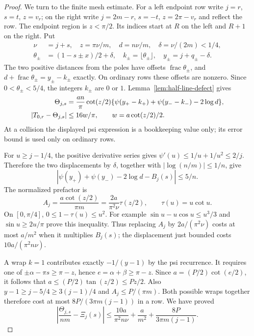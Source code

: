 \begin{proof}
We turn to the finite mesh estimate.  For a left endpoint row write
$j=r$, $s=t$, $z=v_r$; on the right write
$j=2m-r$, $s=-t$, $z=2\pi-v_r$ and reflect the row.
The endpoint region is $z<\pi/2$.  Its indices start at $R$ on
the left and $R+1$ on the right.  Put
\begin{align*}
 \nu&=j+s,\quad z=\pi\nu/m,\quad d=n\nu/m,
       \quad\delta=\nu/(2m)<1/4,\\
 \theta_\pm&=(1-s\pm x)/2+\delta,\quad
       k_\pm=\lfloor\theta_\pm\rfloor,\quad
       y_\pm=j+q_\pm-\delta.
\end{align*}
The two positive distances from the poles have offsets
$\operatorname{frac}\theta_\pm$, and
$d+\operatorname{frac}\theta_\pm=y_\pm-k_\pm$ exactly.
On ordinary rows these offsets are nonzero.  Since
$0<\theta_\pm<5/4$, the integers $k_\pm$ are $0$ or $1$.
Lemma~\ref{lem:half-line-defect} gives
\begin{align}
 \Theta_{j,s}&=\frac{an}{\pi}\cot(z/2)
       \{\psi(y_+-k_+)+\psi(y_--k_-)-2\log d\},
       \notag\\
 |T_{0,r}-\Theta_{j,s}|&\leq16w/\pi,
       \qquad w=a\cot(z/2)/2.
       \label{eq:pole-displaced-Theta}
\end{align}
At a collision the displayed psi expression is a bookkeeping value
only; its error bound is used only on ordinary rows.

For $u\geq j-1/4$, the positive derivative series gives
$\psi'(u)\leq1/u+1/u^2\leq2/j$.  Therefore the two displacements
by $\delta$, together with $|\log(n/m)|\leq1/n$, give
\[
 |\psi(y_+)+\psi(y_-)-2\log d-B_j(s)|\leq5/n.
\]
The normalized prefactor is
\[
 A_j=\frac{a\cot(z/2)}{\pi m}
       =\frac{2a}{\pi^2\nu}\tau(z/2),\qquad \tau(u)=u\cot u.
\]
On $[0,\pi/4]$, $0\leq1-\tau(u)\leq u^2$.
For example $\sin u-u\cos u\leq u^3/3$ and
$\sin u\geq2u/\pi$ prove this inequality.
Thus replacing $A_j$ by $2a/(\pi^2\nu)$ costs at most $a/m^2$
when it multiplies $B_j(s)$; the displacement just bounded costs
$10a/(\pi^2n\nu)$.

A wrap $k=1$ contributes exactly $-1/(y-1)$ by the psi recurrence.
It requires one of $\pm\alpha-\pi s\geq\pi-z$, hence
$e=\alpha+\beta\geq\pi-z$.  Since
$a=(P/2)\cot(e/2)$, it follows that
$a\leq(P/2)\tan(z/2)\leq Pz/2$.
Also $y-1\geq j-5/4\geq3(j-1)/4$ and
$A_j\leq P/(\pi m)$.  Both possible wraps together therefore cost
at most $8P/(3\pi m(j-1))$ in a row.  We have proved
\begin{equation}\label{eq:pole-finite-Xi-comparison}
 \left|\frac{\Theta_{j,s}}{nm}-\Xi_j(s)\right|
 \leq\frac{10a}{\pi^2n\nu}+\frac a{m^2}
                            +\frac{8P}{3\pi m(j-1)}.
\end{equation}


\end{proof}
